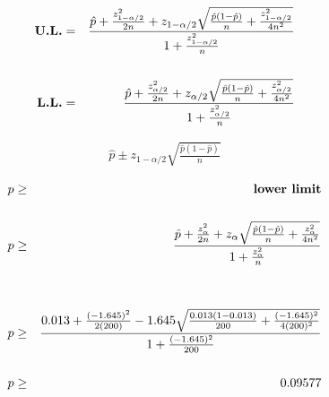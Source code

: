 \documentclass[12pt]{article}
\begin{document}
\pagestyle{empty} 
\Large
{}
\pagecolor{ehandbook}

\boldmath

\hspace*{.25in}



\begin{eqnarray*}
\mbox{\bf U.L.} & = & \frac{\hat{p} + \frac{z^2_{1-\alpha/2}}{2n} + z_{1-\alpha/2}
\sqrt{ \frac{\hat{p}(1-\hat{p})}{n} + \frac{z^2_{1-\alpha/2}}{4n^2} }}
{1 + \frac{z^2_{1-\alpha/2}}{n}} \\
 &   & \\
\mbox{\bf L.L.} & = & \frac{\hat{p} + \frac{z^2_{\alpha/2}}{2n} + z_{\alpha/2}
\sqrt{ \frac{\hat{p}(1-\hat{p})}{n} + \frac{z^2_{\alpha/2}}{4n^2} }}
{1 + \frac{z^2_{\alpha/2}}{n}} 
\end{eqnarray*}

\hspace*{.25in}
 
\begin{eqnarray*}
\hat{p} \pm z_{1-\alpha/2}\sqrt{\frac{\hat{p}(1-\hat{p})}{n} }
\end{eqnarray*}

\hspace*{.25in}

\begin{eqnarray*}
p & \ge & \mbox{\bf lower limit} \\
        & \\
p & \ge & \frac{\hat{p} + \frac{z^2_{\alpha}}{2n} + z_{\alpha}
\sqrt{ \frac{\hat{p}(1-\hat{p})}{n} + \frac{z^2_{\alpha}}{4n^2} }}
{1 + \frac{z^2_{\alpha}}{n}} \\
     &   & \\
      &  & \\
p & \ge & \frac{0.013 + \frac{(-1.645)^2}{2(200)} -1.645
\sqrt{ \frac{0.013(1-0.013)}{200} + \frac{(-1.645)^2}{4(200)^2} }}
{1 + \frac{(-1.645)^2}{200}} \\
      &  & \\
p & \ge & 0.09577
\end{eqnarray*}
\end{document}
